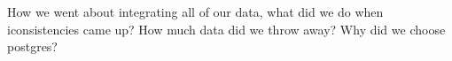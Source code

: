 How we went about integrating all of our data,
what did we do when iconsistencies came up?
How much data did we throw away?
Why did we choose postgres?
